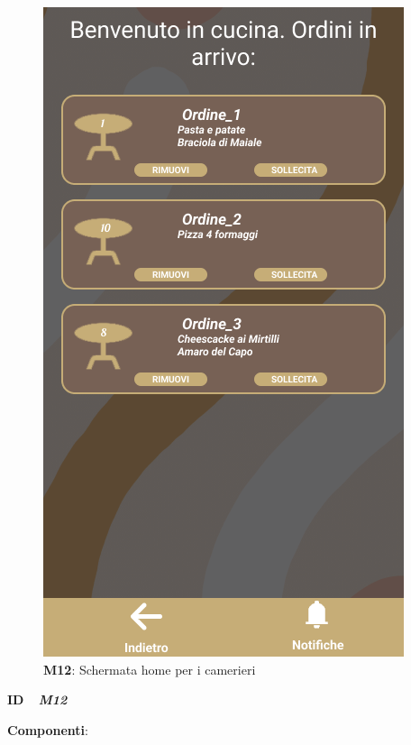           \begin{figure}[H]
            \centering
            \includegraphics[scale=0.5]{assets/diagrammi/Mockup/Mockup_OrderStatus.png}
            \caption*{\textbf{M12}: Schermata home per i camerieri}
            \label{fig:Mockup_OrderStatus}
          \end{figure}

            \begin{flushleft}
              \textbf{ID}   \ \Large{ \emph{\textbf{M12}}}
            \end{flushleft}
  
            \textbf{Componenti}:
            
